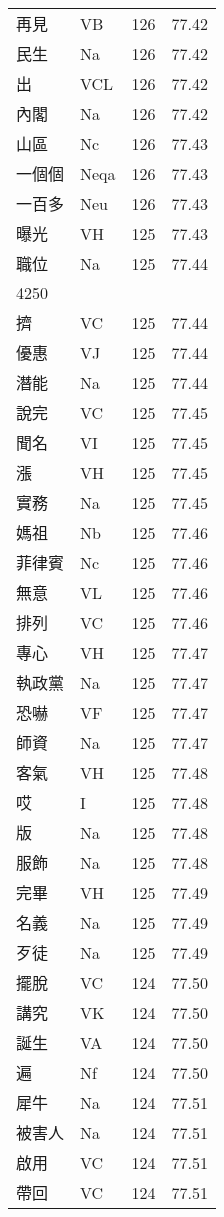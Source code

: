 \documentclass[twocolumn]{book}
\begin{document}
\begin{supertabular}{llrr}
再見 & VB & 126 &  77.42\\
民生 & Na & 126 &  77.42\\
出 & VCL & 126 &  77.42\\
內閣 & Na & 126 &  77.42\\
山區 & Nc & 126 &  77.43\\
一個個 & Neqa & 126 &  77.43\\
一百多 & Neu & 126 &  77.43\\
曝光 & VH & 125 &  77.43\\
職位 & Na & 125 &  77.44\\
4250\\
擠 & VC & 125 &  77.44\\
優惠 & VJ & 125 &  77.44\\
潛能 & Na & 125 &  77.44\\
說完 & VC & 125 &  77.45\\
聞名 & VI & 125 &  77.45\\
漲 & VH & 125 &  77.45\\
實務 & Na & 125 &  77.45\\
媽祖 & Nb & 125 &  77.46\\
菲律賓 & Nc & 125 &  77.46\\
無意 & VL & 125 &  77.46\\
排列 & VC & 125 &  77.46\\
專心 & VH & 125 &  77.47\\
執政黨 & Na & 125 &  77.47\\
恐嚇 & VF & 125 &  77.47\\
師資 & Na & 125 &  77.47\\
客氣 & VH & 125 &  77.48\\
哎 & I & 125 &  77.48\\
版 & Na & 125 &  77.48\\
服飾 & Na & 125 &  77.48\\
完畢 & VH & 125 &  77.49\\
名義 & Na & 125 &  77.49\\
歹徒 & Na & 125 &  77.49\\
擺脫 & VC & 124 &  77.50\\
講究 & VK & 124 &  77.50\\
誕生 & VA & 124 &  77.50\\
遍 & Nf & 124 &  77.50\\
犀牛 & Na & 124 &  77.51\\
被害人 & Na & 124 &  77.51\\
啟用 & VC & 124 &  77.51\\
帶回 & VC & 124 &  77.51\\

\end{supertabular}
\end{document}
